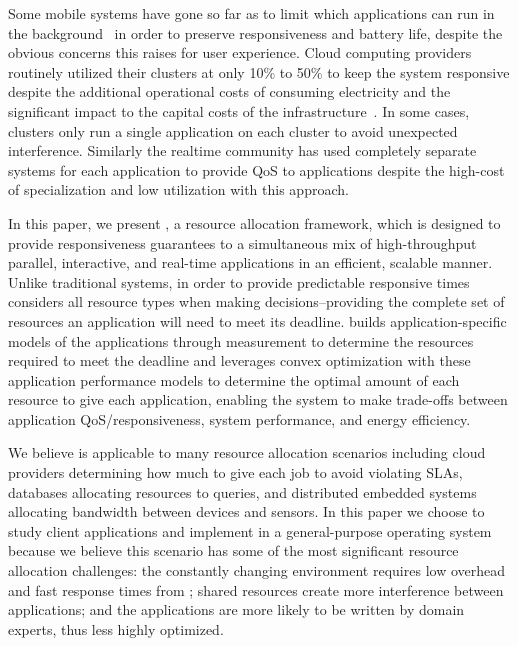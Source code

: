 Some mobile systems have gone so far as to limit which applications can run in the background~\cite{iOsDev} in order to preserve responsiveness and battery life, despite the obvious concerns this raises for user experience.  Cloud computing providers routinely utilized their clusters at only 10\% to 50\% to keep the system responsive despite the additional operational costs of consuming electricity and the significant impact to the capital costs of the infrastructure~\cite{Barroso2009,Hennessy2011}.   In some cases, clusters only run a single application on each cluster to avoid unexpected interference.  Similarly the realtime community has used completely separate systems for each application to provide QoS to applications despite the high-cost of specialization and low utilization with this approach.

In this paper, we present \pacora, a resource allocation framework, which is designed to provide responsiveness guarantees to a simultaneous mix of high-throughput parallel, interactive, and real-time applications in an efficient, scalable manner.  Unlike traditional systems, in order to provide predictable responsive times \pacora considers all resource types when making decisions--providing the complete set of resources an application will need to meet its deadline.   \pacora builds application-specific models of the applications through measurement to determine the resources required to meet the deadline and leverages convex optimization with these application performance models to determine the optimal amount of each resource to give each application, enabling the system to make trade-offs between application QoS/responsiveness, system performance, and energy efficiency. 

We believe \pacora is applicable to many resource allocation scenarios including cloud providers determining how much to give each job to avoid violating SLAs, databases allocating resources to queries, and distributed embedded systems allocating bandwidth between devices and sensors.  In this paper we choose to study client applications and implement \pacora in a general-purpose operating system because we believe this scenario has some of the most significant resource allocation challenges: the constantly changing environment requires low overhead and fast response times from \pacora;  shared resources create more interference between applications; and the applications are more likely to be written by domain experts, thus less highly optimized.


